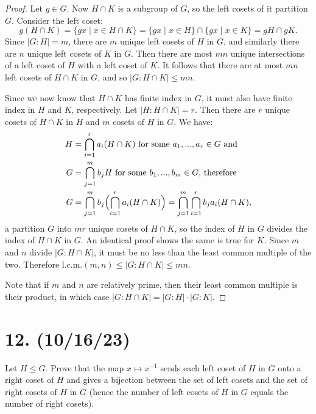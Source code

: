 \documentclass{article}
\begin{document}
\begin{proof}
    Let $g \in G$. Now $H \cap K$ is a subgroup of $G$, so the left cosets of it partition $G$. Consider the left coset:
    \begin{equation*}
        g(H \cap K) = \{ gx \mid x \in H \cap K \} = \{ gx \mid x \in H \} \cap \{ gx \mid x \in K \} = gH \cap gK. 
    \end{equation*}
    Since $|G:H| = m$, there are $m$ unique left cosets of $H$ in $G$, and similarly there are $n$ unique left cosets of $K$ in $G$. Then there are most $mn$ unique intersections of a left coset of $H$ with a left coset of $K$. It follows that there are at most $mn$ left cosets of $H \cap K$ in $G$, and so $|G : H \cap K| \leq mn$.

    Since we now know that $H \cap K$ has finite index in $G$, it must also have finite index in $H$ and $K$, respectively. Let $|H : H \cap K| = r$. Then there are $r$ unique cosets of $H \cap K$ in $H$ and $m$ cosets of $H$ in $G$. We have:
    \begin{align*}
        H &= \bigcap_{i = 1}^r a_i(H \cap K) \text{ for some $a_1, ..., a_r \in G$ and} \\
        G &= \bigcap_{j = 1}^m b_j H \text{ for some $b_1, ..., b_m \in G$, therefore} \\
        G &= \bigcap_{j = 1}^m b_j \Bigl( \bigcap_{i = 1}^r a_i (H \cap K) \Bigr) = \bigcap_{j = 1}^m \bigcap_{i = 1}^r b_j a_i (H \cap K),
    \end{align*}
    a partition $G$ into $mr$ unique cosets of $H \cap K$, so the index of $H$ in $G$ divides the index of $H \cap K$ in $G$. An identical proof shows the same is true for $K$. Since $m$ and $n$ divide $|G : H \cap K|$, it must be no less than the least common multiple of the two. Therefore l.c.m.$(m, n) \leq |G : H \cap K| \leq mn$.

    Note that if $m$ and $n$ are relatively prime, then their least common multiple is their product, in which case $|G : H \cap K| = |G : H| \cdot |G : K|$.
\end{proof}

\section*{12. (10/16/23)}

Let $H \leq G$. Prove that the map $x \mapsto x^{-1}$ sends each left coset of $H$ in $G$ onto a right coset of $H$ and gives a bijection between the set of left cosets and the set of right cosets of $H$ in $G$ (hence the number of left cosets of $H$ in $G$ equals the number of right cosets).
\end{document}
